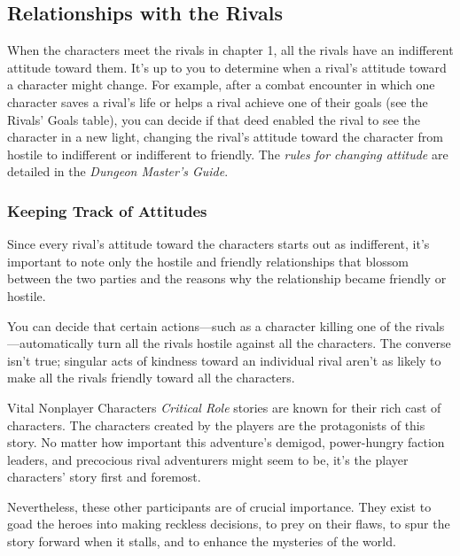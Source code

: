 \documentclass[10pt,a4paper,twoside,fancy,bg=print,twocolumn,openany,nodeprecatedcode]{dndbook}
\begin{document}
\subsection{Relationships with the Rivals}
When the characters meet the rivals in chapter 1, all the rivals have an indifferent attitude toward them. It's up to you to determine when a rival's attitude toward a character might change. For example, after a combat encounter in which one character saves a rival's life or helps a rival achieve one of their goals (see the Rivals' Goals table), you can decide if that deed enabled the rival to see the character in a new light, changing the rival's attitude toward the character from hostile to indifferent or indifferent to friendly. The \textit{rules for changing attitude} are detailed in the \textit{Dungeon Master's Guide}.

\subsubsection{Keeping Track of Attitudes}
Since every rival's attitude toward the characters starts out as indifferent, it's important to note only the hostile and friendly relationships that blossom between the two parties and the reasons why the relationship became friendly or hostile.

You can decide that certain actions—such as a character killing one of the rivals—automatically turn all the rivals hostile against all the characters. The converse isn't true; singular acts of kindness toward an individual rival aren't as likely to make all the rivals friendly toward all the characters.

\begin{DndSidebar}[float=!b]{Vital Nonplayer Characters}
\textit{Critical Role} stories are known for their rich cast of characters. The characters created by the players are the protagonists of this story. No matter how important this adventure's demigod, power-hungry faction leaders, and precocious rival adventurers might seem to be, it's the player characters' story first and foremost.



Nevertheless, these other participants are of crucial importance. They exist to goad the heroes into making reckless decisions, to prey on their flaws, to spur the story forward when it stalls, and to enhance the mysteries of the world.



\end{DndSidebar}
\end{document}
